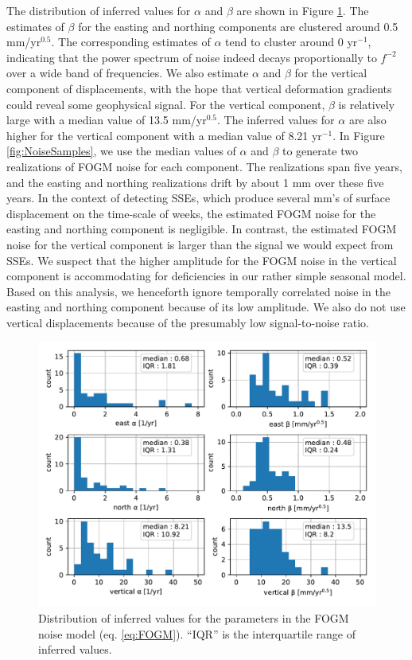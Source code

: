 \documentclass[extra,mreferee]{gji}
\begin{document}
The distribution of inferred values for $\alpha$ and $\beta$ are shown
in Figure \ref{fig:NoiseParams}. The estimates of $\beta$ for the
easting and northing components are clustered around 0.5
mm/yr$^{0.5}$. The corresponding estimates of $\alpha$ tend to cluster
around 0 yr$^{-1}$, indicating that the power spectrum of noise indeed
decays proportionally to $f^{-2}$ over a wide band of frequencies. We
also estimate $\alpha$ and $\beta$ for the vertical component of
displacements, with the hope that vertical deformation gradients could
reveal some geophysical signal. For the vertical component, $\beta$ is
relatively large with a median value of 13.5 mm/yr$^{0.5}$. The
inferred values for $\alpha$ are also higher for the vertical
component with a median value of 8.21 yr$^{-1}$. In Figure
\ref{fig:NoiseSamples}, we use the median values of $\alpha$ and
$\beta$ to generate two realizations of FOGM noise for each component.
The realizations span five years, and the easting and northing
realizations drift by about 1 mm over these five years. In the context
of detecting SSEs, which produce several mm's of surface displacement
on the time-scale of weeks, the estimated FOGM noise for the easting
and northing component is negligible. In contrast, the estimated FOGM
noise for the vertical component is larger than the signal we would
expect from SSEs. We suspect that the higher amplitude for the FOGM
noise in the vertical component is accommodating for deficiencies in
our rather simple seasonal model. Based on this analysis, we
henceforth ignore temporally correlated noise in the easting and
northing component because of its low amplitude. We also do not use
vertical displacements because of the presumably low signal-to-noise
ratio.

\begin{figure}
\includegraphics{figures/noise/noise-params.pdf}
\caption{
Distribution of inferred values for the parameters in the FOGM noise
model (eq. \ref{eq:FOGM}). ``IQR'' is the interquartile range of
inferred values.
}   
\label{fig:NoiseParams}
\end{figure}
\end{document}
